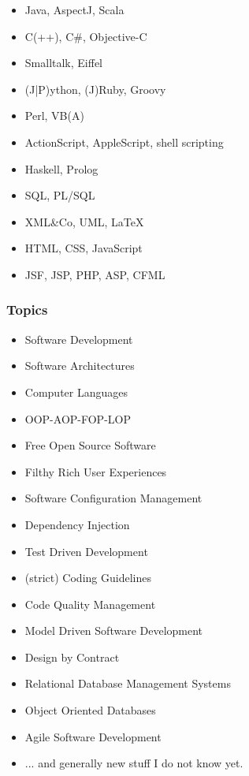 \begin{itemize}
    \item Java, AspectJ, Scala
    \item C(++), C\#, Objective-C
    \item Smalltalk, Eiffel
    \item (J|P)ython, (J)Ruby, Groovy
    \item Perl, VB(A)
    \item ActionScript, AppleScript, shell scripting
    \item Haskell, Prolog
    \item SQL, PL/SQL
    \item XML\&Co, UML, LaTeX
    \item HTML, CSS, JavaScript
    \item JSF, JSP, PHP, ASP, CFML 
\end{itemize}


\subsubsection{Topics}

\begin{itemize}
    \item Software Development
    \item Software Architectures
    \item Computer Languages
    \item OOP-AOP-FOP-LOP
    \item Free Open Source Software
    \item Filthy Rich User Experiences
    \item Software Configuration Management
    \item Dependency Injection
    \item Test Driven Development
    \item (strict) Coding Guidelines
    \item Code Quality Management
    \item Model Driven Software Development
    \item Design by Contract
    \item Relational Database Management Systems
    \item Object Oriented Databases
    \item Agile Software Development
    \item ... and generally new stuff I do not know yet.
\end{itemize}


%
